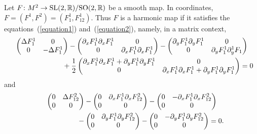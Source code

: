 \documentclass[pdftex]{sigma}
\numberwithin{equation}{section}
\begin{document}
Let $F\colon M^2 \rightarrow {\rm SL}(2,{\mathbb R})/{\rm SO}(2,{\mathbb R})$ be a smooth map. In coordinates,   $F = (F^1,F^2)=(F^1_1,F^1_{12})$. Thus $F$ is a harmonic map if it satisf\/ies the equations~(\ref{equation1}) and~(\ref{equation2}), namely, in a matrix context,
\begin{gather*}
  \left(
  \begin{matrix}
    \Delta F^1_{1} & 0 \\
    0 & -\Delta F^1_{1}
  \end{matrix}
  \right)
  -
  \left(
  \begin{matrix}
    \partial_x F^1_1 \partial_x F^1_{1} & 0\\
    0 & \partial_x F^1_1 \partial_x F^1_{1}
  \end{matrix}
  \right)
  -
  \left(
  \begin{matrix}
    \partial_yF^1_1\partial_yF^1_1 & 0 \\
    0 & \partial_yF^1_1\partial_y^1F_1
  \end{matrix}
  \right)
    \\
  \hphantom{  \left(
  \begin{matrix}
    \Delta F^1_{1} & 0 \\
    0 & -\Delta F^1_{1}
  \end{matrix}
  \right)}{}
  + \frac{1}{2}\left(
  \begin{matrix}
    \partial_x F^1_1 \partial_x F^1_{1} + \partial_yF^1_1\partial_yF^1_{1} & 0 \\
    0 & \partial_x F^1_1 \partial_x F^1_{1}+ \partial_yF^1_1\partial_yF^1_{1}
  \end{matrix}
  \right) =   0
\end{gather*}
and
\begin{gather*}
  \left(
  \begin{matrix}
    0 & \Delta F^2_{12}\\
    0 & 0
  \end{matrix}
  \right)
  -
  \left(
  \begin{matrix}
    0 & \partial_x F^1_1 \partial_x F^2_{12} \\
    0 & 0
  \end{matrix}
  \right)
  -
  \left(
  \begin{matrix}
    0 & -\partial_xF^1_1\partial_xF^2_{12}  \\
    0 & 0
  \end{matrix}
  \right)
 \\
\hphantom{  \left(
  \begin{matrix}
    0 & \Delta F^2_{12}\\
    0 & 0
  \end{matrix}
  \right)}{}
  -
  \left(
  \begin{matrix}
    0 & \partial_yF^1_1\partial_yF^2_{12}\\
    0 & 0
  \end{matrix}
  \right)
  -
  \left(
  \begin{matrix}
    0 & -\partial_yF^1_1\partial_yF^2_{12}\\
    0 & 0
  \end{matrix}
  \right)
    =   0.
\end{gather*}
\end{document}
